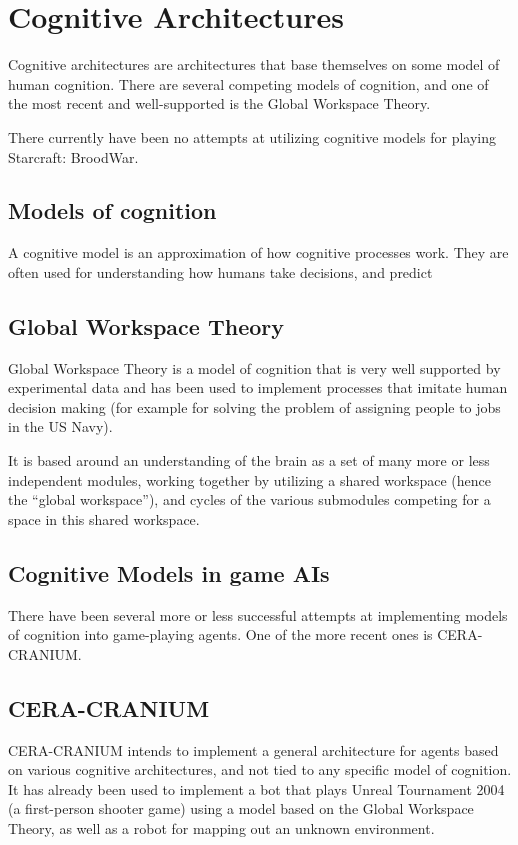 \section{Cognitive Architectures}
Cognitive architectures are architectures that base themselves on some model of
human cognition. There are several competing models of cognition, and one of
the most recent and well-supported is the Global Workspace Theory.

There currently have been no attempts at utilizing cognitive models for playing
Starcraft: BroodWar.

\subsection{Models of cognition}
A cognitive model is an approximation of how cognitive processes work. They are
often used for understanding how humans take decisions, and predict 

\subsection{Global Workspace Theory}

Global Workspace Theory is a model of cognition that is very well supported
by experimental data and has been used to implement processes that imitate
human decision making (for example for solving the problem of assigning
people to jobs in the US Navy). 

It is based around an understanding of the brain as a set of many more or less
independent modules, working together by utilizing a shared workspace (hence the
``global workspace''), and cycles of the various submodules competing for a
space in this shared workspace.\cite{baars2005gwd}

\subsection{Cognitive Models in game AIs}
There have been several more or less successful attempts at implementing models
of cognition into game-playing agents. One of the more recent ones is
CERA-CRANIUM.


\subsection{CERA-CRANIUM}
CERA-CRANIUM intends to implement a general architecture for agents based on
various cognitive architectures, and not tied to any specific model of
cognition. It has already been used to implement a bot that plays Unreal
Tournament 2004 (a first-person shooter game) using a model based on the Global
Workspace Theory, as well as a robot for mapping out an unknown environment.
\cite{arrabales2009ceracranium}

